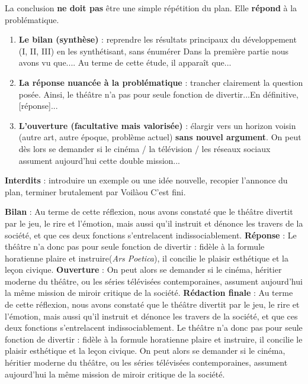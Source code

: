 \documentclass[11pt]{article}
\newcommand{\cle}[1]{{\popxbold\color{popdark}#1}}
\newcounter{popsec}
\newcounter{popsub}
\newcommand{\courssub}[1]{%
  \stepcounter{popsub}%
  \par\vspace{9pt}\noindent{\popxbold\fontsize{11.5}{13}\selectfont\color{popink}{\color{poporange}\thepopsec.\thepopsub}\hspace{6pt}#1}\par\nopagebreak\vspace{4pt}
}
\begin{document}
\courssub{Rédaction et amélioration de la conclusion}

\begin{methode}
La conclusion \textbf{ne doit pas} être une simple répétition du plan. Elle \textbf{répond} à la problématique.
\begin{enumerate}
\item \textbf{Le bilan (synthèse)} : reprendre les résultats principaux du développement (I, II, III) en les \cle{synthétisant}, sans énumérer \og Dans la première partie nous avons vu que...\fg. \og Au terme de cette étude, il apparaît que...\fg
\item \textbf{La réponse nuancée à la problématique} : trancher clairement la question posée. \og Ainsi, le théâtre n'a pas pour seule fonction de divertir...\fg \og En définitive, [réponse]...\fg
\item \textbf{L'ouverture (facultative mais valorisée)} : élargir vers un horizon voisin (autre art, autre époque, problème actuel) \textbf{sans nouvel argument}. \og On peut dès lors se demander si le cinéma / la télévision / les réseaux sociaux assument aujourd'hui cette double mission...\fg
\end{enumerate}
\textbf{Interdits} : introduire un exemple ou une idée nouvelle, recopier l'annonce du plan, terminer brutalement par \og Voilà\fg ou \og C'est fini\fg.
\end{methode}

\begin{exoresolu}
\tcblower
\textbf{Bilan} : Au terme de cette réflexion, nous avons constaté que le théâtre divertit par le jeu, le rire et l'émotion, mais aussi qu'il instruit et dénonce les travers de la société, et que ces deux fonctions s'entrelacent indissociablement.
\textbf{Réponse} : Le théâtre n'a donc pas pour seule fonction de divertir : fidèle à la formule horatienne \og plaire et instruire\fg (\emph{Ars Poetica}), il concilie le plaisir esthétique et la leçon civique.
\textbf{Ouverture} : On peut alors se demander si le cinéma, héritier moderne du théâtre, ou les séries télévisées contemporaines, assument aujourd'hui la même mission de \cle{miroir critique} de la société.
\textbf{Rédaction finale} : Au terme de cette réflexion, nous avons constaté que le théâtre divertit par le jeu, le rire et l'émotion, mais aussi qu'il instruit et dénonce les travers de la société, et que ces deux fonctions s'entrelacent indissociablement. Le théâtre n'a donc pas pour seule fonction de divertir : fidèle à la formule horatienne \og plaire et instruire\fg, il concilie le plaisir esthétique et la leçon civique. On peut alors se demander si le cinéma, héritier moderne du théâtre, ou les séries télévisées contemporaines, assument aujourd'hui la même mission de miroir critique de la société.
\end{exoresolu}
\end{document}
